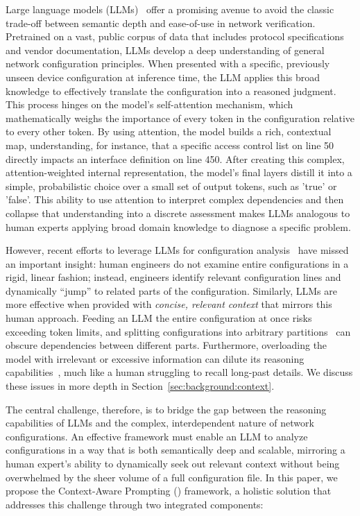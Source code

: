 Large language models (LLMs)~\cite{deepseekai2024deepseekv3technicalreport, achiam2023gpt} offer a promising avenue to avoid the classic trade-off between semantic depth and ease-of-use in network verification. Pretrained on a vast, public corpus of data that includes protocol specifications and vendor documentation, LLMs develop a deep understanding of general network configuration principles. When presented with a specific, previously unseen device configuration at inference time, the LLM applies this broad knowledge to effectively translate the configuration into a reasoned judgment. This process hinges on the model's self-attention mechanism, which mathematically weighs the importance of every token in the configuration relative to every other token. By using attention, the model builds a rich, contextual map, understanding, for instance, that a specific access control list on line 50 directly impacts an interface definition on line 450. After creating this complex, attention-weighted internal representation, the model’s final layers distill it into a simple, probabilistic choice over a small set of output tokens, such as 'true' or 'false'. This ability to use attention to interpret complex dependencies and then collapse that understanding into a discrete assessment makes LLMs analogous to human experts applying broad domain knowledge to diagnose a specific problem.

However, recent efforts to leverage LLMs for configuration analysis~\cite{bogdanov2024leveraging,wang2024identifying,liu2024large, wang2024netconfeval, lian2023configuration} have missed an important insight:
human engineers do not examine entire configurations in a rigid, linear fashion; instead, engineers identify relevant configuration lines and dynamically ``jump'' to related parts of the configuration. Similarly, LLMs are more effective when provided with {\em concise, relevant context} that mirrors this human approach. Feeding an LLM the entire configuration at once risks exceeding token limits, and splitting configurations into arbitrary partitions~\cite{lian2023configuration} can obscure dependencies between different parts. Furthermore, overloading the model with irrelevant or excessive information can dilute its reasoning capabilities~\cite{lican,li2024long,qian2024long}, much like a human struggling to recall long-past details. We discuss these issues in more depth in Section~\ref{sec:background:context}.

The central challenge, therefore, is to bridge the gap between the reasoning capabilities of LLMs and the complex, interdependent nature of network configurations. An effective framework must enable an LLM to analyze configurations in a way that is both semantically deep and scalable, mirroring a human expert's ability to dynamically seek out relevant context without being overwhelmed by the sheer volume of a full configuration file.
In this paper, we propose the Context-Aware Prompting (\sysname{}) framework, a holistic solution that addresses this challenge through two integrated components:

